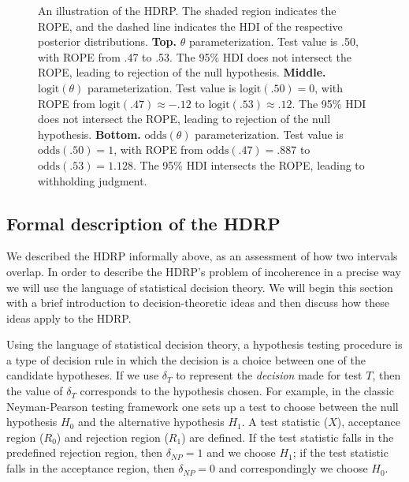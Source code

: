 \documentclass[man]{apa}
\newcommand{\hdr}{HDRP}
\newcommand{\oddss}{\text{odds}}
\newcommand{\logit}{\text{logit}}
\begin{document}
\begin{figure}[!!ht]
    \caption{An illustration of the \hdr{}. The shaded region indicates the ROPE, and the dashed line indicates the HDI of the respective posterior distributions. \textbf{Top.} $\theta$ parameterization. Test value is .50, with ROPE from .47 to .53. The 95\% HDI does not intersect the ROPE, leading to rejection of the null hypothesis. \textbf{Middle.} $\logit(\theta)$ parameterization. Test value is $\logit(.50)=0$, with ROPE from $\logit(.47)\approx-.12$ to $\logit(.53)\approx.12$. The 95\% HDI does not intersect the ROPE, leading to rejection of the null hypothesis. \textbf{Bottom.} $\oddss(\theta)$ parameterization. Test value is $\oddss(.50)=1$, with ROPE from $\oddss(.47)=.887$ to $\oddss(.53)=1.128$. The 95\% HDI intersects the ROPE, leading to withholding judgment.}
    \label{fig:ropes}
\end{figure}



    \subsection*{Formal description of the \hdr{}}

We described the \hdr{} informally above, as an assessment of how two intervals overlap. In order to describe the \hdr{}'s problem of incoherence in a precise way we will use the language of statistical decision theory. 
We will begin this section with a brief introduction to decision-theoretic ideas and then discuss how these ideas apply to the \hdr{}.
 
Using the language of statistical decision theory, a hypothesis testing procedure is a type of decision rule in which the decision is a choice between one of the candidate hypotheses. If we use $\delta_T$ to represent the \textit{decision} made for test $T$, then the value of $\delta_T$ corresponds to the hypothesis chosen. For example, in the classic Neyman-Pearson testing framework one sets up a test to choose between the null hypothesis $H_0$ and the alternative hypothesis $H_1$. A test statistic ($X$), acceptance region ($R_0$) and rejection region ($R_1$) are defined. If the test statistic falls in the predefined rejection region, then $\delta_{NP}=1$ and we choose $H_1$; if the test statistic falls in the acceptance region, then $\delta_{NP}=0$ and correspondingly we choose $H_0$.
\end{document}
